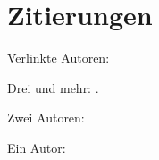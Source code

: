 \documentclass[ngerman]{scrbook}
\begin{document}
\chapter{Zitierungen}
Verlinkte Autoren:

Drei und mehr:\citeauthor{ABC01} \cite{ABC01}.

Zwei Autoren: \citeauthor{AB00} \cite{AB00}

Ein Autor: \citeauthor{Ez10} \cite{Ez10}

\nocite{*}
\printbibliography
\end{document}
